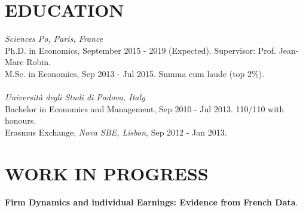 \documentclass{res}
\begin{document}
\begin{resume}
\section{\small EDUCATION} 
    \vspace{5pt}	
    \textit{Sciences Po, Paris, France} \\
    Ph.D. in Economics, September 2015 - 2019 (Expected). Supervisor: Prof. Jean-Marc Robin.\\
    M.Sc. in Economics, Sep 2013 - Jul 2015. Summa cum laude (top 2\%).\\
    \\[-2pt]        
    \textit{Universit\`{a} degli Studi di Padova, Italy}  \\       
    Bachelor in Economics and Management, Sep 2010 - Jul 2013. 110/110 with honours.\\
    Erasmus Exchange, \textit{Nova SBE, Lisbon}, Sep 2012 - Jan 2013.

\section{\small WORK IN PROGRESS}
    \vspace{5pt}	
    \textbf{Firm Dynamics and individual Earnings: Evidence from French Data}.

\end{resume}
\end{document}
